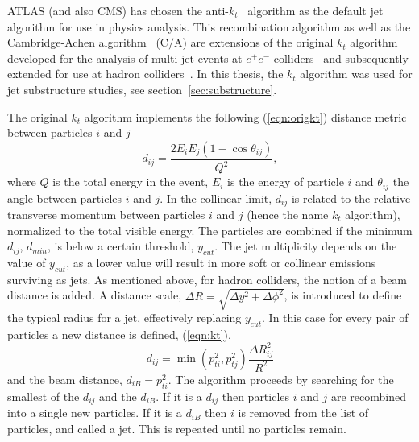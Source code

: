 ATLAS (and also CMS) has chosen the anti-$k_t$~\cite{antiktalg} algorithm as the default jet algorithm for use in physics analysis.  This recombination algorithm as well as the Cambridge-Achen algorithm~\cite{CamAchen} (C$/$A) are extensions 
 of the original $k_t$ algorithm developed for the analysis of multi-jet events at $e^+ e^-$ colliders~\cite{JADE} and subsequently extended for use at hadron colliders~\cite{kt2,kt1}. In this thesis, the $k_t$ algorithm was used for jet substructure studies, see section~\ref{sec:substructure}.

The original $k_t$ algorithm implements the following (\ref{eqn:origkt}) distance metric between particles $i$ and $j$
\begin{equation} 
d_{ij} = \frac{2E_i E_j (1- \cos \theta_{ij}) }{Q^2},
\label{eqn:origkt}
\end{equation}
where $Q$ is the total energy in the event, $E_i$ is the energy of particle $i$ and $\theta_{ij}$ the angle between particles $i$ and $j$. In the collinear limit, $d_{ij}$ is related to the relative transverse momentum between particles $i$ and $j$ (hence the name $k_t$ algorithm), normalized to the total visible energy.
The particles are combined if the minimum $d_{ij}$, $d_{min}$, is below a certain threshold, $y_{cut}$.  The jet multiplicity depends on the value of $y_{cut}$, as a lower value will result in more soft or collinear emissions surviving as jets. %
As mentioned above, for hadron colliders, the notion of a beam distance is added. A distance scale, $\Delta R = \sqrt{\Delta y^2 +\Delta \phi^2}$, is introduced to define the typical radius for a jet, effectively replacing $y_{cut}$. In this case for every pair of particles a new distance is defined, (\ref{eqn:kt}),
\begin{equation} 
d_{ij} = \min(p^2_{ti},p^2_{tj}) \frac{\Delta R^2_{ij}}{R^2}
\label{eqn:kt}
\end{equation}
and the beam distance, $d_{iB}=p^2_{ti}$. %
The algorithm proceeds by searching for the smallest of the $d_{ij}$ and the $d_{iB}$. If it is a $d_{ij}$ then particles $i$ and $j$ are recombined into a single new particles. If it is a $d_{iB}$ then $i$ is removed from the list of particles, and called a jet. This is repeated until no particles remain.

